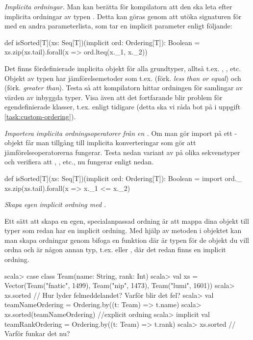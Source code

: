 \Subtask \emph{Implicita ordningar.} Man kan berätta för kompilatorn att den ska leta efter implicita ordningar av typen  . Detta kan göras genom att utöka signaturen för  med en andra parameterlista, som tar en implicit parameter enligt följande:

\begin{CodeSmall}
def isSorted[T](xs: Seq[T])(implicit ord: Ordering[T]): Boolean =  
  xs.zip(xs.tail).forall(x => ord.lteq(x._1, x._2))
\end{CodeSmall}

Det finns fördefinierade implicita objekt  för alla grundtyper, alltså t.ex. , , etc. Objekt av typen  har jämförelsemetoder som t.ex.  (förk. \emph{less than or equal}) och  (förk. \emph{greater than}).
Testa så att kompilatorn hittar ordningen för samlingar av värden av inbyggda typer. Visa även att det fortfarande blir problem för egendefinierade klasser, t.ex.  enligt tidigare (detta ska vi råda bot på i uppgift \ref{task:custom-ordering}).

\Subtask \emph{Importera implicita ordningsoperatorer från en .} Om man gör import på ett -objekt får man tillgång till implicita konverteringar som gör att jämförelseoperatorerna fungerar. Testa nedan variant av  på olika sekvenstyper och verifiera att \code{<=}, \code{>}, etc., nu fungerar enligt nedan.
\begin{CodeSmall}
def isSorted[T](xs: Seq[T])(implicit ord: Ordering[T]): Boolean = {  
  import ord._
  xs.zip(xs.tail).forall(x => x._1 <= x._2)
}
\end{CodeSmall}


\Task  \label{task:custom-ordering} \emph{Skapa egen implicit ordning med .}  

\Subtask Ett sätt att skapa en egen, specialanpassad ordning är att mappa dina objekt till typer som redan har en implicit ordning. Med hjälp av metoden  i objektet  kan man skapa ordningar genom bifoga en funktion  där  är typen för de objekt du vill ordna och  är någon annan typ, t.ex.  eller , där det redan finns en implicit ordning.
\begin{REPL}
scala> case class Team(name: String, rank: Int)
scala> val xs = 
         Vector(Team("fnatic", 1499), Team("nip", 1473), Team("lumi", 1601))
scala> xs.sorted  // Hur lyder felmeddelandet? Varför blir det fel?
scala> val teamNameOrdering = Ordering.by((t: Team) => t.name)
scala> xs.sorted(teamNameOrdering)   //explicit ordning
scala> implicit val teamRankOrdering = Ordering.by((t: Team) => t.rank)
scala> xs.sorted   // Varför funkar det nu?
\end{REPL}

